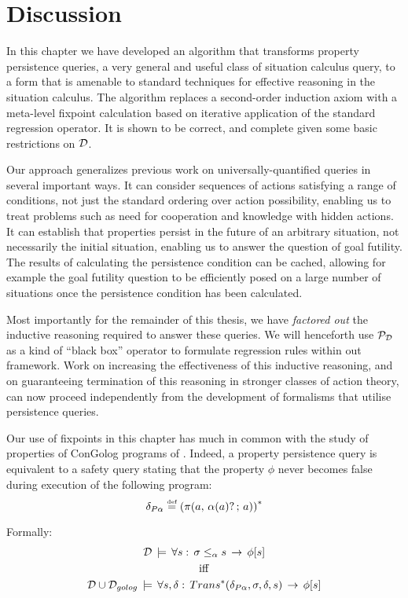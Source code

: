 \section{Discussion\label{sec:Persistence:Discussion}}

In this chapter we have developed an algorithm that transforms property
persistence queries, a very general and useful class of situation
calculus query, to a form that is amenable to standard techniques
for effective reasoning in the situation calculus. The algorithm replaces
a second-order induction axiom with a meta-level fixpoint calculation
based on iterative application of the standard regression operator.
It is shown to be correct, and complete given some basic restrictions
on $\mathcal{D}$.

Our approach generalizes previous work on universally-quantified queries
in several important ways. It can consider sequences of actions satisfying
a range of conditions, not just the standard ordering over action
possibility, enabling us to treat problems such as need for cooperation
and knowledge with hidden actions. It can establish that properties
persist in the future of an arbitrary situation, not necessarily the
initial situation, enabling us to answer the question of goal futility.
The results of calculating the persistence condition can be cached,
allowing for example the goal futility question to be efficiently
posed on a large number of situations once the persistence condition
has been calculated.

Most importantly for the remainder of this thesis, we have \emph{factored
out} the inductive reasoning required to answer these queries. We
will henceforth use $\mathcal{P}_{\mathcal{D}}$ as a kind of {}``black box'' operator
to formulate regression rules within out framework. Work on increasing
the effectiveness of this inductive reasoning, and on guaranteeing
termination of this reasoning in stronger classes of action theory,
can now proceed independently from the development of formalisms that
utilise persistence queries.

Our use of fixpoints in this chapter has much in common with the study
of properties of ConGolog programs of \citep{ternovska97congolog_fixpoint,classen08golog_properties}.
Indeed, a property persistence query is equivalent to a safety query
stating that the property $\phi$ never becomes false during execution
of the following program:\[
\delta_{P\alpha}\stackrel{\mbox{\tiny def}}{=}\left(\pi(a,\,\alpha(a)?\,;\, a)\right)^{*}\]


Formally:\begin{gather*}
\mathcal{D}\,\models\,\forall s:\,\sigma\leq_{\alpha}s\,\rightarrow\,\phi[s]\\
\mathrm{iff}\\
\mathcal{D}\cup\mathcal{D}_{golog}\,\models\,\forall s,\delta:\, Trans^{*}(\delta_{P\alpha},\sigma,\delta,s)\,\rightarrow\,\phi[s]\end{gather*}


